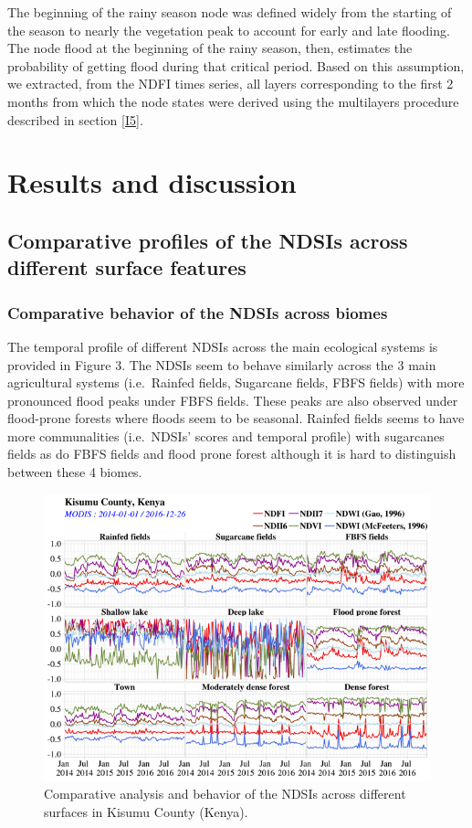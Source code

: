 \documentclass[12pt,oneside]{article}
\begin{document}
The beginning of the rainy season node was defined widely from the starting of the season to nearly the vegetation peak to account for early and late flooding. The node flood at the beginning of the rainy season, then, estimates the probability of getting flood during that critical period. Based on this assumption, we extracted, from the NDFI times series, all layers corresponding to the first 2 months from which the node states were derived using the multilayers procedure described in section \ref{I5}.

\hypertarget{II}{%
\section{Results and discussion}\label{II}}

\hypertarget{II1}{%
\subsection{Comparative profiles of the NDSIs across different surface features}\label{II1}}

\hypertarget{II11}{%
\subsubsection{Comparative behavior of the NDSIs across biomes}\label{II11}}

The temporal profile of different NDSIs across the main ecological systems is provided in Figure 3. The NDSIs seem to behave similarly across the 3 main agricultural systems (i.e.~Rainfed fields, Sugarcane fields, FBFS fields) with more pronounced flood peaks under FBFS fields. These peaks are also observed under flood-prone forests where floods seem to be seasonal. Rainfed fields seems to have more communalities (i.e.~NDSIs' scores and temporal profile) with sugarcanes fields as do FBFS fields and flood prone forest although it is hard to distinguish between these 4 biomes.

\begin{figure}
\includegraphics[width=1\linewidth]{figures/Mapping_FBFS_ndsi_comparaison} \caption{Comparative analysis and behavior of the NDSIs across different surfaces in Kisumu County (Kenya).}\label{fig:fig3}
\end{figure}
\end{document}
